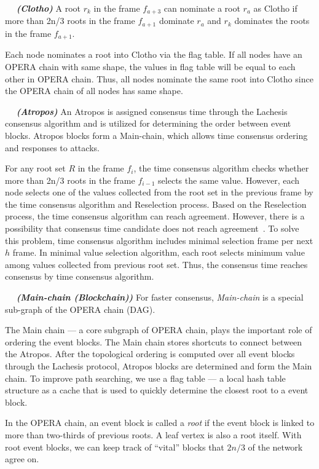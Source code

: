 \documentclass{article}
\newcommand{\dfnn}[2]{$\quad$ \textbf{\emph{(#1)}} {#2}}
\begin{document}
\dfnn{Clotho}{A root $r_k$ in the frame $f_{a+3}$ can nominate a root $r_a$ as Clotho if more than 2n/3 roots in the frame $f_{a+1}$ dominate $r_a$ and $r_k$ dominates the roots in the frame $f_{a+1}$.}

Each node nominates a root into Clotho via the flag table. If all nodes have an OPERA chain with same shape, the values in flag table will be equal to each other in OPERA chain. Thus, all nodes nominate the same root into Clotho since the OPERA chain of all nodes has same shape.

\dfnn{Atropos}{An Atropos is assigned consensus time through the Lachesis consensus algorithm and is utilized for determining the order between event blocks. Atropos blocks form a Main-chain, which allows time consensus ordering and responses to attacks.}

For any root set $R$ in the frame $f_{i}$, the time consensus algorithm checks whether more than 2n/3 roots in the frame $f_{i-1}$ selects the same value. However, each node selects one of the values collected from the root set in the previous frame by the time consensus algorithm and Reselection process. Based on the Reselection process, the time consensus algorithm can reach agreement. However, there is a possibility that consensus time candidate does not reach agreement~\cite{Fischer85}. To solve this problem, time consensus algorithm includes minimal selection frame per next $h$ frame. In minimal value selection algorithm, each root selects minimum value among values collected from previous root set. Thus, the consensus time reaches consensus by time consensus algorithm.

\dfnn{Main-chain (Blockchain)}{For faster consensus, \emph{Main-chain} is a special sub-graph of the OPERA chain (DAG).}

The Main chain --- a core subgraph of OPERA chain, plays the important role of ordering the event blocks. The Main chain stores shortcuts to connect between the Atropos. 
After the topological ordering is computed over all event blocks through the Lachesis protocol, Atropos blocks are determined and form the Main chain.  To improve path searching, we use a flag table --- a local hash table structure as a cache that is used to quickly determine the closest root to a event block.

In the OPERA chain, an event block is called a \emph{root} if the event block is linked to more than two-thirds of previous roots. A leaf vertex is also a root itself. With root event blocks, we can keep track of ``vital'' blocks that $2n/3$ of the network agree on.  
\end{document}

